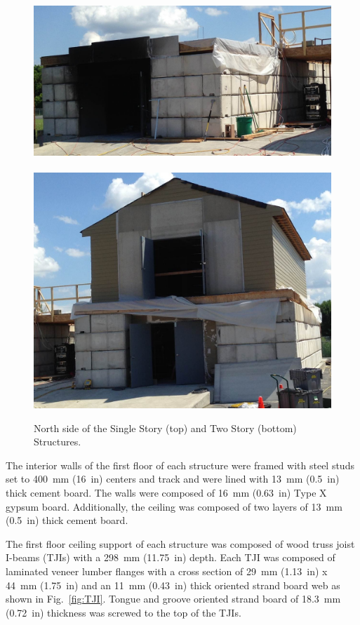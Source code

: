 \documentclass[12pt,oneside]{book}
\begin{document}
\begin{figure}[!ht]
	\includegraphics[width=5.25in]{../Figures/Pictures/east_structure}
	\\~\\
	\includegraphics[width=5.25in]{../Figures/Pictures/west_structure}
	\caption[North side of the Single Story and Two Story Structures.]{North side of the Single Story (top) and Two Story (bottom) Structures.}
	\label{fig:struct_pics}
\end{figure}

The interior walls of the first floor of each structure were framed with steel studs set to 400~mm (16~in) centers and track and were lined with 13~mm (0.5~in) thick cement board. The walls were composed of 16~mm (0.63~in) Type X gypsum board. Additionally, the ceiling was composed of two layers of 13~mm (0.5~in) thick cement board.
\FloatBarrier

The first floor ceiling support of each structure was composed of wood truss joist I-beams (TJIs) with a 298~mm (11.75~in) depth. Each TJI was composed of laminated veneer lumber flanges with a cross section of 29~mm (1.13~in) x 44~mm (1.75~in) and an 11~mm (0.43~in) thick oriented strand board web as shown in Fig.~\ref{fig:TJI}. Tongue and groove oriented strand board of 18.3~mm (0.72~in) thickness was screwed to the top of the TJIs.
\end{document}
